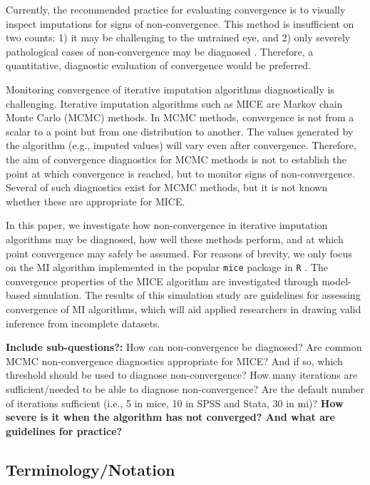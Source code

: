 \documentclass[Royal,times,sageh]{sagej}
\begin{document}
Currently, the recommended practice for evaluating convergence is to
visually inspect imputations for signs of non-convergence. This method
is insufficient on two counts: 1) it may be challenging to the untrained
eye, and 2) only severely pathological cases of non-convergence may be
diagnosed \citep[\(\S\) 6.5.2]{buur18}. Therefore, a quantitative,
diagnostic evaluation of convergence would be preferred.

Monitoring convergence of iterative imputation algorithms diagnostically
is challenging. Iterative imputation algorithms such as MICE are Markov
chain Monte Carlo (MCMC) methods. In MCMC methods, convergence is not
from a scalar to a point but from one distribution to another. The
values generated by the algorithm (e.g., imputed values) will vary even
after convergence. Therefore, the aim of convergence diagnostics for
MCMC methods is not to establish the point at which convergence is
reached, but to monitor signs of non-convergence. Several of such
diagnostics exist for MCMC methods, but it is not known whether these
are appropriate for MICE.

In this paper, we investigate how non-convergence in iterative
imputation algorithms may be diagnosed, how well these methods perform,
and at which point convergence may safely be assumed. For reasons of
brevity, we only focus on the MI algorithm implemented in the popular
\texttt{mice} package \citep{mice} in \texttt{R} \citep{R}. The
convergence properties of the MICE algorithm are investigated through
model-based simulation. The results of this simulation study are
guidelines for assessing convergence of MI algorithms, which will aid
applied researchers in drawing valid inference from incomplete datasets.

\textbf{Include sub-questions?:} How can non-convergence be diagnosed?
Are common MCMC non-convergence diagnostics appropriate for MICE? And if
so, which threshold should be used to diagnose non-convergence? How many
iterations are sufficient/needed to be able to diagnose non-convergence?
Are the default number of iterations sufficient (i.e., 5 in mice, 10 in
SPSS and Stata, 30 in mi)? \textbf{How severe is it when the algorithm
has not converged? And what are guidelines for practice?}

\hypertarget{terminologynotation}{%
\subsection{Terminology/Notation}\label{terminologynotation}}
\end{document}
